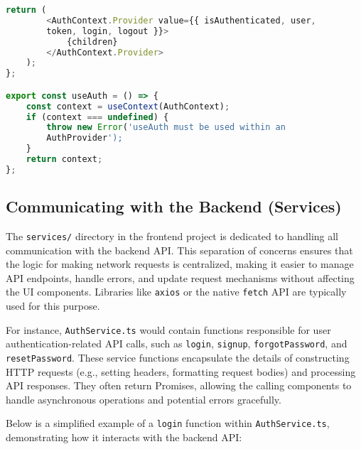 \documentclass{report}
\begin{document}
\begin{lstlisting}[caption={Code Snippet 4.3: Simplified \texttt{AuthContext.tsx} demonstrating global authentication state management using React Context API.},label={lst:authcontext},language=TypeScript]
    return (
        <AuthContext.Provider value={{ isAuthenticated, user,
        token, login, logout }}>
            {children}
        </AuthContext.Provider>
    );
};

export const useAuth = () => {
    const context = useContext(AuthContext);
    if (context === undefined) {
        throw new Error('useAuth must be used within an
        AuthProvider');
    }
    return context;
};
\end{lstlisting}

\subsection{Communicating with the Backend (Services)}
\label{sec:communicating_backend}
The \texttt{services/} directory in the frontend project is dedicated to handling all communication with the backend API. This separation of concerns ensures that the logic for making network requests is centralized, making it easier to manage API endpoints, handle errors, and update request mechanisms without affecting the UI components. Libraries like \texttt{axios} or the native \texttt{fetch} API are typically used for this purpose.

For instance, \texttt{AuthService.ts} would contain functions responsible for user authentication-related API calls, such as \texttt{login}, \texttt{signup}, \texttt{forgotPassword}, and \texttt{resetPassword}. These service functions encapsulate the details of constructing HTTP requests (e.g., setting headers, formatting request bodies) and processing API responses. They often return Promises, allowing the calling components to handle asynchronous operations and potential errors gracefully.

Below is a simplified example of a \texttt{login} function within \texttt{AuthService.ts}, demonstrating how it interacts with the backend API:
\end{document}

